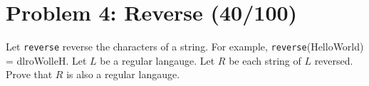 \documentclass[11pt]{article}
\begin{document}
 
\section*{Problem 4: Reverse (40/100)}
Let {\tt reverse} reverse the characters of a string.
For example, {\tt reverse}(HelloWorld) = dlroWolleH.
Let $L$ be a regular langauge.
Let $R$ be each string of $L$ reversed.
Prove that $R$ is also a regular langauge.
\end{document}
